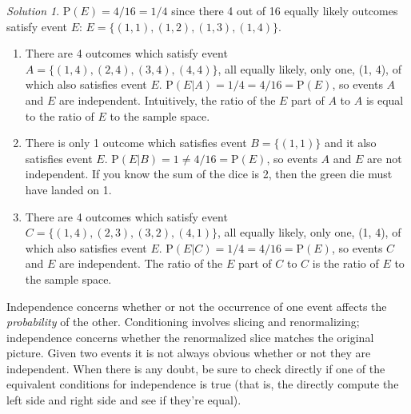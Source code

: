 \documentclass[
  letterpaper,
  DIV=11,
  numbers=noendperiod]{scrreprt}
\providecommand{\tightlist}{%
  \setlength{\itemsep}{0pt}\setlength{\parskip}{0pt}}
\theoremstyle{plain}
\theoremstyle{definition}
\theoremstyle{definition}
\theoremstyle{definition}
\theoremstyle{remark}
\newtheorem{refsolution}{Solution}[chapter]
\begin{document}
\begin{tcolorbox}[enhanced jigsaw, opacityback=0, rightrule=.15mm, coltitle=black, colframe=quarto-callout-tip-color-frame, toprule=.15mm, colbacktitle=quarto-callout-tip-color!10!white, opacitybacktitle=0.6, left=2mm, toptitle=1mm, breakable, title={Solution (click to expand)}, bottomtitle=1mm, colback=white, leftrule=.75mm, titlerule=0mm, arc=.35mm, bottomrule=.15mm]

\begin{refsolution}
\(\textrm{P}(E)=4/16=1/4\) since there 4 out of 16 equally likely
outcomes satisfy event \(E\): \(E=\{(1, 1), (1, 2), (1, 3), (1, 4)\}\).

\begin{enumerate}
\def\labelenumi{\arabic{enumi}.}
\tightlist
\item
  There are 4 outcomes which satisfy event
  \(A=\{(1, 4), (2, 4), (3, 4), (4, 4)\}\), all equally likely, only
  one, (1, 4), of which also satisfies event \(E\).
  \(\textrm{P}(E|A) = 1/4 = 4/16 = \textrm{P}(E)\), so events \(A\) and
  \(E\) are independent. Intuitively, the ratio of the \(E\) part of
  \(A\) to \(A\) is equal to the ratio of \(E\) to the sample space.
\item
  There is only 1 outcome which satisfies event \(B=\{(1, 1)\}\) and it
  also satisfies event \(E\).
  \(\textrm{P}(E|B) = 1 \neq 4/16 = \textrm{P}(E)\), so events \(A\) and
  \(E\) are not independent. If you know the sum of the dice is 2, then
  the green die must have landed on 1.
\item
  There are 4 outcomes which satisfy event
  \(C=\{(1, 4), (2, 3), (3, 2), (4, 1)\}\), all equally likely, only
  one, (1, 4), of which also satisfies event \(E\).
  \(\textrm{P}(E|C) = 1/4 = 4/16 = \textrm{P}(E)\), so events \(C\) and
  \(E\) are independent. The ratio of the \(E\) part of \(C\) to \(C\)
  is the ratio of \(E\) to the sample space.
\end{enumerate}

\label{sol-dice-independent}

\end{refsolution}

\end{tcolorbox}

Independence concerns whether or not the occurrence of one event affects
the \emph{probability} of the other. Conditioning involves slicing and
renormalizing; independence concerns whether the renormalized slice
matches the original picture. Given two events it is not always obvious
whether or not they are independent. When there is any doubt, be sure to
check directly if one of the equivalent conditions for independence is
true (that is, the directly compute the left side and right side and see
if they're equal).
\end{document}
